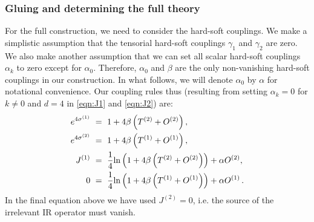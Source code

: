 \documentclass[prd,reprint,a4paper,showpacs,superscriptaddress,11pt,onecolumn,nofootinbib]{revtex4-1}
\renewcommand{\(}{\left(}
\renewcommand{\)}{\right)}
\newcommand{\6}{\partial}
\begin{document}
\subsubsection{Gluing and determining the full theory}
For the full construction, we need to consider the hard-soft couplings. We make a simplistic assumption that the tensorial hard-soft couplings $\gamma_1$ and $\gamma_2$ are zero. We also make another assumption that we can set all scalar hard-soft couplings $\alpha_k$ to zero except for $\alpha_0$. Therefore, $\alpha_0$ and $\beta$ are the only non-vanishing hard-soft couplings in our construction. In what follows, we will denote $\alpha_0$ by $\alpha$ for notational convenience. Our coupling rules thus (resulting from setting $\alpha_k = 0$ for $k \neq 0$ and $d =4$ in  \eqref{eqn:J1} and \eqref{eqn:J2}) are:
\begin{subequations}
\label{allequations}
\begin{align}
e^{4\sigma^{(1)}} ~ &= ~ 1 +4 \beta \left(T^{(2)} + O^{(2)}\right) ,\label{eqn:sigma1n}\\
e^{4\sigma^{(2)}} ~ &= ~ 1+ 4 \beta  \left(T^{(1)} + O^{(1)}\right), \label{eqn:sigma2n}\\
J^{(1)} ~ &= ~ \frac{1}{4}{\rm ln} \left(1 +4\beta\left(T^{(2)} + O^{(2)}\right)\right) + \alpha O^{(2)},\label{eqn:J1n}\\
0~ &= ~ \frac{1}{4}{\rm ln} \left(1 + 4\beta\left(T^{(1)} + O^{(1)}\right)\right) + \alpha O^{(1)}\, . \label{eqn:J2n}
\end{align}
\end{subequations}
In the final equation above we have used $J^{(2)} = 0$, i.e. the source of the irrelevant IR operator must vanish.
 
\end{document}
